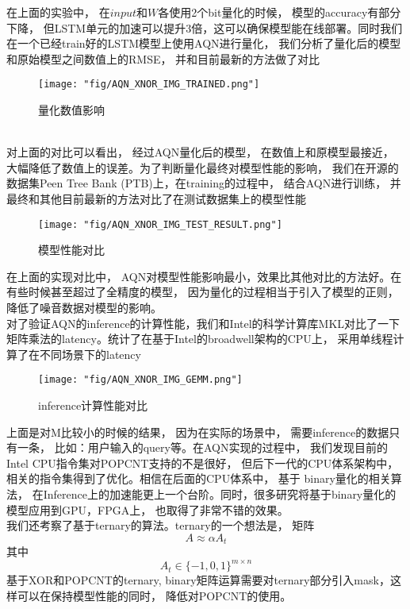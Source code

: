 在上面的实验中， 在$input$和$W$各使用2个bit量化的时候， 模型的accuracy有部分下降， 但LSTM单元的加速可以提升3倍，这可以确保模型能在线部署。同时我们在一个已经train好的LSTM模型上使用AQN进行量化， 我们分析了量化后的模型和原始模型之间数值上的RMSE， 并和目前最新的方法做了对比 
\begin{figure}[!h]
    \centering
    \texttt{[image: "fig/AQN\_XNOR\_IMG\_TRAINED.png"]}
    \caption{量化数值影响}
    \label{fig:AQN_XNOR_IMG_TRAINED}
\end{figure} \\
对上面的对比可以看出， 经过AQN量化后的模型， 在数值上和原模型最接近， 大幅降低了数值上的误差。为了判断量化最终对模型性能的影响， 我们在开源的数据集Peen Tree Bank (PTB)上，在training的过程中， 结合AQN进行训练， 并最终和其他目前最新的方法对比了在测试数据集上的模型性能\\
\begin{figure}[!h]
    \centering
    \texttt{[image: "fig/AQN\_XNOR\_IMG\_TEST\_RESULT.png"]}
    \caption{模型性能对比}
    \label{fig:AQN_XNOR_IMG_TEST_RESULT}
\end{figure}
在上面的实现对比中， AQN对模型性能影响最小，效果比其他对比的方法好。在有些时候甚至超过了全精度的模型， 因为量化的过程相当于引入了模型的正则， 降低了噪音数据对模型的影响。\\
对了验证AQN的inference的计算性能，我们和Intel的科学计算库MKL对比了一下矩阵乘法的latency。统计了在基于Intel的broadwell架构的CPU上， 采用单线程计算了在不同场景下的latency

\begin{figure}[!h]
    \centering
    \texttt{[image: "fig/AQN\_XNOR\_IMG\_GEMM.png"]}
    \caption{inference计算性能对比}
    \label{fig:AQN_XNOR_IMG_GEMM}
\end{figure}

上面是对M比较小的时候的结果， 因为在实际的场景中， 需要inference的数据只有一条， 比如：用户输入的query等。在AQN实现的过程中， 我们发现目前的Intel CPU指令集对POPCNT支持的不是很好， 但后下一代的CPU体系架构中， 相关的指令集得到了优化。相信在后面的CPU体系中， 基于 binary量化的相关算法， 在Inference上的加速能更上一个台阶。同时，很多研究将基于binary量化的模型应用到GPU，FPGA上， 也取得了非常不错的效果。\\
我们还考察了基于ternary的算法。ternary的一个想法是， 矩阵 $$A \approx \alpha A_t$$ 其中 $$A_t \in \{-1, 0, 1\}^{m \times n}$$ 基于XOR和POPCNT的ternary, binary矩阵运算需要对ternary部分引入mask，这样可以在保持模型性能的同时， 降低对POPCNT的使用。


